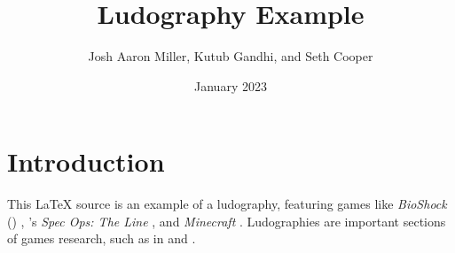 \documentclass[sigconf]{acmart}
\title{Ludography Example}
\author{Josh Aaron Miller, Kutub Gandhi, and Seth Cooper}
\date{January 2023}
\newcommand{\citegameprefix}{G}
\begin{document}
\maketitle

\section{Introduction}

This \LaTeX{} source is an example of a ludography, featuring games like \emph{BioShock} (\citeyear{bioshock}) , \citeauthor{specops}'s  \emph{Spec Ops: The Line} , and \emph{Minecraft} . Ludographies are important sections of games research, such as in \cite{gandhi_philosophy_2022} and \cite{poretski2022press}.



\renewcommand{\bibnumfmt}[1]{[#1]}%



\renewcommand{\bibnumfmt}[1]{[\citegameprefix#1]}%

\end{document}
